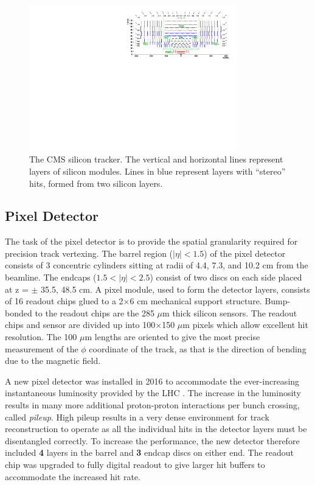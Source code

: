 \begin{figure}
\centering
\includegraphics[width=0.8\textwidth]{figs/TrackerLayoutNew.pdf}
\caption[The CMS silicon tracker]{The CMS silicon tracker. The vertical and horizontal lines represent layers of silicon modules. Lines in blue represent layers with ``stereo'' hits, formed from two silicon layers.}
\label{fig:tracker}
\end{figure}

\subsection{Pixel Detector}

The task of the pixel detector is to provide the spatial granularity required for precision track vertexing. The barrel region ($|\eta|<1.5$) of the pixel detector consists of 3 concentric cylinders sitting at radii of 4.4, 7.3, and 10.2 cm from the beamline. The endcaps ($1.5<|\eta|<2.5$) consist of two discs on each side placed at z = $\pm$ 35.5, 48.5 cm. A pixel module, used to form the detector layers, consists of 16 readout chips glued to a 2$\times$6 cm mechanical support structure. Bump-bonded to the readout chips are the 285 $\mu$m thick silicon sensors. The readout chips and sensor are divided up into 100$\times$150 $\mu$m pixels which allow excellent hit resolution. The 100 $\mu$m lengths are oriented to give the most precise measurement of the $\phi$ coordinate of the track, as that is the direction of bending due to the magnetic field.  

A new pixel detector was installed in 2016 to accommodate the ever-increasing instantaneous luminosity provided by the LHC \cite{newpixel}. The increase in the luminosity results in many more additional proton-proton interactions per bunch crossing, called \textit{pileup}.  High pileup results in a very dense environment for track reconstruction to operate as all the individual hits in the detector layers must be disentangled correctly. To increase the performance, the new detector therefore included \textbf{4} layers in the barrel and \textbf{3} endcap discs on either end. The readout chip was upgraded to fully digital readout to give larger hit buffers to accommodate the increased hit rate.

